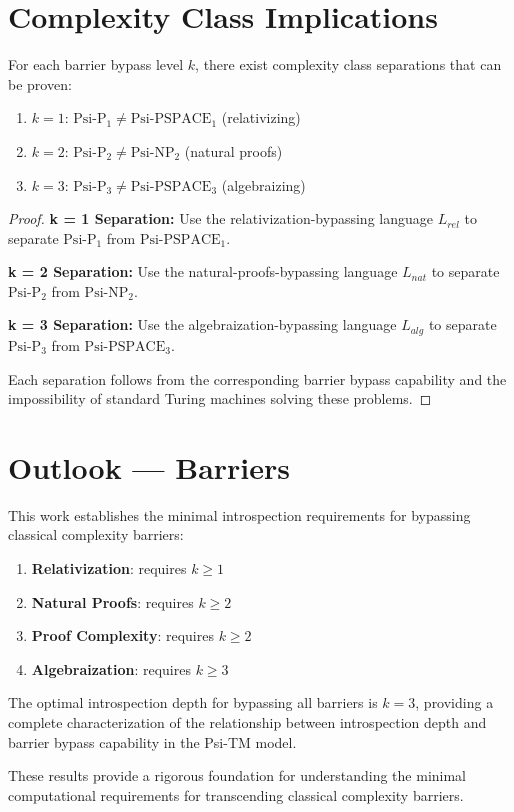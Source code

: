 \section{Complexity Class Implications}

\begin{theorem}
For each barrier bypass level $k$, there exist complexity class separations that can be proven:
\begin{enumerate}
\item $k = 1$: $\text{Psi-P}_1 \neq \text{Psi-PSPACE}_1$ (relativizing)
\item $k = 2$: $\text{Psi-P}_2 \neq \text{Psi-NP}_2$ (natural proofs)
\item $k = 3$: $\text{Psi-P}_3 \neq \text{Psi-PSPACE}_3$ (algebraizing)
\end{enumerate}
\end{theorem}

\begin{proof}
\textbf{k = 1 Separation:}
Use the relativization-bypassing language $L_{rel}$ to separate $\text{Psi-P}_1$ from $\text{Psi-PSPACE}_1$.

\textbf{k = 2 Separation:}
Use the natural-proofs-bypassing language $L_{nat}$ to separate $\text{Psi-P}_2$ from $\text{Psi-NP}_2$.

\textbf{k = 3 Separation:}
Use the algebraization-bypassing language $L_{alg}$ to separate $\text{Psi-P}_3$ from $\text{Psi-PSPACE}_3$.

Each separation follows from the corresponding barrier bypass capability and the impossibility of standard Turing machines solving these problems.
\end{proof}

\section{Outlook — Barriers}

This work establishes the minimal introspection requirements for bypassing classical complexity barriers:

\begin{enumerate}
\item \textbf{Relativization}: requires $k \geq 1$
\item \textbf{Natural Proofs}: requires $k \geq 2$
\item \textbf{Proof Complexity}: requires $k \geq 2$
\item \textbf{Algebraization}: requires $k \geq 3$
\end{enumerate}

The optimal introspection depth for bypassing all barriers is $k = 3$, providing a complete characterization of the relationship between introspection depth and barrier bypass capability in the Psi-TM model.

These results provide a rigorous foundation for understanding the minimal computational requirements for transcending classical complexity barriers.

